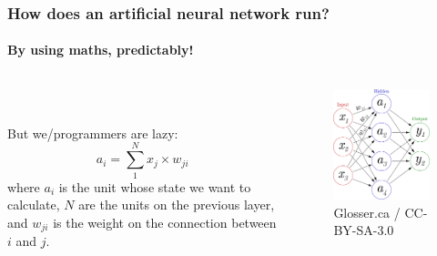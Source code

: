 \documentclass[mathserif]{beamer}
\begin{document}
\begin{frame}
\frametitle{How does an artificial neural network run?}
\framesubtitle{By using maths, predictably!}
  \begin{columns}[T]
    \begin{column}{.5\textwidth}
     \ \\
     \ \\
     
But we/programmers are lazy:
\begin{equation*}
a_i = \sum_1^N x_j \times w_{ji}
\end{equation*}
where $a_i$ is the unit whose state we want to calculate, $N$ are the units on the previous layer, and $w_{ji}$ is the weight on the connection between $i$ and $j$.

    \end{column}
    \begin{column}{.5\textwidth}
	\begin{figure}
	\centering
	\includegraphics[width=\linewidth]{./fig/3-layer_maths.pdf}
	  \caption{Glosser.ca / CC-BY-SA-3.0}
	\end{figure}
    \end{column}
  \end{columns}
\end{frame}
\end{document}
